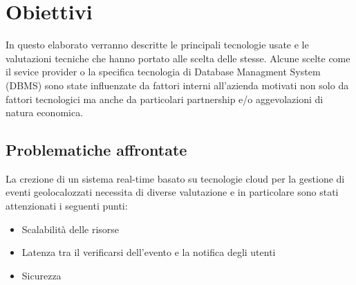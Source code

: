 \chapter{Obiettivi}
In questo elaborato verranno descritte le principali tecnologie usate e le valutazioni tecniche che hanno portato alle scelta delle stesse. Alcune scelte come il sevice provider o la specifica tecnologia di Database Managment System (DBMS) sono state influenzate da fattori interni all'azienda motivati non solo da fattori tecnologici ma anche da particolari partnership e/o aggevolazioni di natura economica.


\section{Problematiche affrontate}
La crezione di un sistema real-time basato su tecnologie cloud per la gestione di eventi geolocalozzati necessita di diverse valutazione e in particolare sono stati attenzionati i seguenti punti:
\begin{itemize}
\item Scalabilità delle risorse
\item Latenza tra il verificarsi dell'evento e la notifica degli utenti
\item Sicurezza
\end{itemize}

